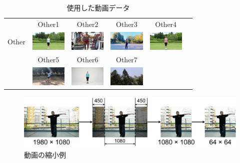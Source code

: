 \begin{table}[t]
\begin{center}
\begin{tabular}{|c|ccc|cc|}
      \\ \hline
        & Other1\cite{radio} & Other2\cite{posing} & Other3\cite{boxing} & Other4\cite{radio2} &
      \\
      Other
        & \includegraphics[width=17mm]{images/snaps/radio_exer.png}
        & \includegraphics[width=17mm]{images/snaps/posing.png}
        & \includegraphics[width=17mm]{images/snaps/shadowboxing.png}
        & \includegraphics[width=17mm]{images/snaps/radio_exer_2.png}
        &
      \\
        & Other5\cite{running} & Other6\cite{shinkokyu} & Other7\cite{leaves} & &
      \\
        & \includegraphics[width=17mm]{images/snaps/running.png}
        & \includegraphics[width=17mm]{images/snaps/shinkokyu.png}
        & \includegraphics[width=17mm]{images/snaps/leaves.png}
        &
        &
      \\ \hline
    \end{tabular}
  \end{center}
  \caption{使用した動画データ}
  \label{video_data}
\end{table}
\clearpage

\begin{figure}[t]
  \begin{center}
    \includegraphics[width=120mm]{images/chart/resize.pdf}
  \end{center}
  \caption{動画の縮小例}
  \label{resize}
\end{figure}


